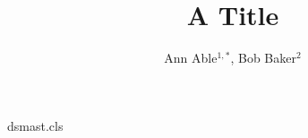\begin{filecontents*}[overwrite]{dsmast.cls}
\def\affiliation#1{\gdef\@affil{\it #1}}
\def\@maketitle{\begin{center}{\LARGE\@title\par}\vskip1em{\large\@author\par}\end{center}
  {\small\@affil\par}\vskip1em}
\end{filecontents*}
\documentclass{dsmast}

\title{A Title}
\author{Ann Able$^{1,*}$, Bob Baker$^{2}$}
\maketitle
Text.


